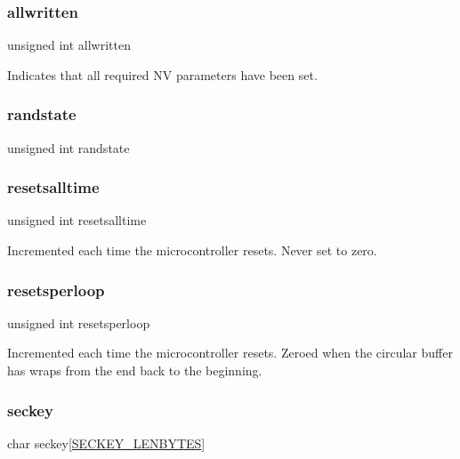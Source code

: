 \subsubsection{\texorpdfstring{allwritten}{allwritten}}
{\footnotesize\ttfamily unsigned int allwritten}

Indicates that all required NV parameters have been set. \mbox{\label{structnvstruct_aec7e67f64e6ee88dda940f1b837f9351}} 
\subsubsection{\texorpdfstring{randstate}{randstate}}
{\footnotesize\ttfamily unsigned int randstate}

\mbox{\label{structnvstruct_a045498ec4eca300d51f030a958ed5ee1}} 
\subsubsection{\texorpdfstring{resetsalltime}{resetsalltime}}
{\footnotesize\ttfamily unsigned int resetsalltime}

Incremented each time the microcontroller resets. Never set to zero. \mbox{\label{structnvstruct_a48f727b15838a972aff7c7d7397ff641}} 
\subsubsection{\texorpdfstring{resetsperloop}{resetsperloop}}
{\footnotesize\ttfamily unsigned int resetsperloop}

Incremented each time the microcontroller resets. Zeroed when the circular buffer has wraps from the end back to the beginning. \mbox{\label{structnvstruct_a680c038327bbd20d30beade8d0ef1dd4}} 
\subsubsection{\texorpdfstring{seckey}{seckey}}
{\footnotesize\ttfamily char seckey\mbox{[}\mbox{\hyperlink{nvtype_8h_ae32c9007f59a1d55426d7fd63e10d589}{S\+E\+C\+K\+E\+Y\+\_\+\+L\+E\+N\+B\+Y\+T\+ES}}\mbox{]}}

